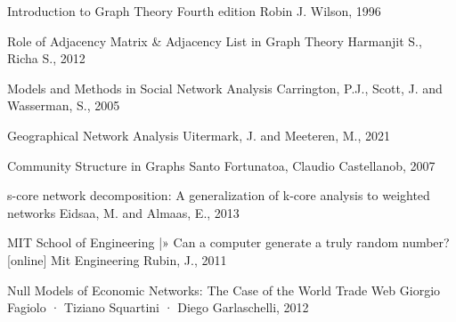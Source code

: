 \documentclass[12pt]{article}
\begin{document}
\begin{thebibliography}{100}
   	{Introduction to Graph Theory Fourth edition }
    Robin J. Wilson,
    1996
    
    {Role of Adjacency Matrix & Adjacency List in Graph Theory}
    Harmanjit S., Richa S.,
    2012
        
    {Models and Methods in Social Network Analysis}
    Carrington, P.J., Scott, J. and Wasserman, S.,
    2005
    
    {Geographical Network Analysis}
    Uitermark, J. and Meeteren, M.,
    2021
    
    {Community Structure in Graphs}
    Santo Fortunatoa, Claudio Castellanob,
    2007
    
    {s-core network decomposition: A generalization of k-core analysis to weighted networks}
    Eidsaa, M. and Almaas, E.,
    2013
    
    {MIT School of Engineering |» Can a computer generate a truly random number? [online] Mit Engineering}
    Rubin, J.,
    2011
    
    {Null Models of Economic Networks: The Case of the World Trade Web}
    Giorgio Fagiolo · Tiziano Squartini · Diego Garlaschelli,
    2012
    
\end{thebibliography}
\end{document}
